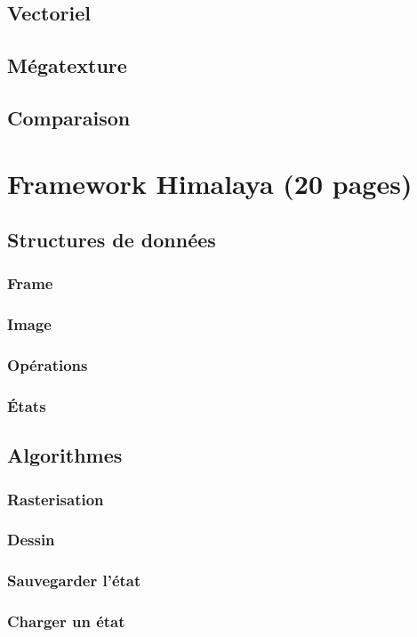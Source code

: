 	\section{Vectoriel}
	\section{Mégatexture}
	\section{Comparaison}
\chapter{Framework Himalaya (20 pages) }
	\section{Structures de données}
		\subsection{Frame}
		\subsection{Image}
		\subsection{Opérations}
		\subsection{États}
	\section{Algorithmes}
		\subsection{Rasterisation}
		\subsection{Dessin}
		\subsection{Sauvegarder l'état}
		\subsection{Charger un état}
